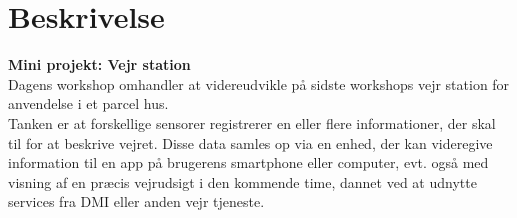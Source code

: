 \section{Beskrivelse}
\textbf{Mini projekt: Vejr station}\\
Dagens workshop omhandler at videreudvikle på sidste workshops vejr station for anvendelse i et parcel hus. \\
Tanken er at forskellige sensorer registrerer en eller flere informationer, der skal til for at beskrive vejret. Disse data samles op via en enhed, der kan videregive information til en app på brugerens smartphone eller computer, evt. også med visning af en præcis vejrudsigt i den kommende time, dannet ved at udnytte services fra DMI eller anden vejr tjeneste.